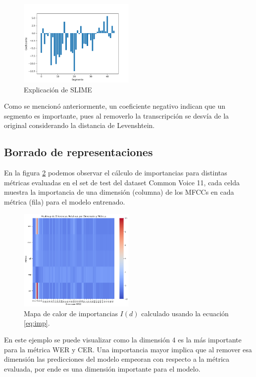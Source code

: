 \documentclass[conference]{IEEEtran}
\begin{document}
\begin{figure}[H]
\centerline{\includegraphics[width=0.5\textwidth]{./images/slime.png}}
\caption{Explicación de SLIME}
\label{fig:slime}
\end{figure}

Como se mencionó anteriormente, un coeficiente negativo indican que un segmento es importante, pues al removerlo la transcripción se desvía de la original considerando la distancia de Levenshtein.

\subsection{Borrado de representaciones}

En la figura \ref{fig:cv_imp} podemos observar el cálculo de importancias para distintas métricas evaluadas en el set de test del dataset Common Voice 11, cada celda muestra la importancia de una dimensión (columna) de los MFCCs en cada métrica (fila) para el modelo entrenado.

\begin{figure}[H]
\centering
\includegraphics[width=0.5\textwidth]{images/importance_plot.png}
\caption{Mapa de calor de importancias $I(d)$ calculado usando la ecuación \ref{eq:imp}.}
\label{fig:cv_imp}
\end{figure}

En este ejemplo se puede visualizar como la dimensión 4 es la más importante para la métrica WER y CER.
Una importancia mayor implica que al remover esa dimensión las predicciones del modelo empeoran con respecto a la métrica evaluada, por ende es una dimensión importante para el modelo.
\end{document}

